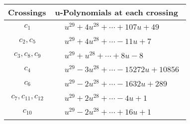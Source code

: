 \documentclass[1p]{elsarticle_modified}
\theoremstyle{definition}
\begin{document}
\begin{tabular}{m{50pt}|m{274pt}}
Crossings & \hspace{64pt}u-Polynomials at each crossing \\
\hline $$\begin{aligned}c_{1}\end{aligned}$$&$\begin{aligned}
&u^{29}+4 u^{28}+\cdots+107 u+49
\end{aligned}$\\
\hline $$\begin{aligned}c_{2},c_{5}\end{aligned}$$&$\begin{aligned}
&u^{29}+4 u^{28}+\cdots-11 u+7
\end{aligned}$\\
\hline $$\begin{aligned}c_{3},c_{8},c_{9}\end{aligned}$$&$\begin{aligned}
&u^{29}+u^{28}+\cdots+8 u-8
\end{aligned}$\\
\hline $$\begin{aligned}c_{4}\end{aligned}$$&$\begin{aligned}
&u^{29}-3 u^{28}+\cdots-15272 u+10856
\end{aligned}$\\
\hline $$\begin{aligned}c_{6}\end{aligned}$$&$\begin{aligned}
&u^{29}-2 u^{28}+\cdots-1632 u+289
\end{aligned}$\\
\hline $$\begin{aligned}c_{7},c_{11},c_{12}\end{aligned}$$&$\begin{aligned}
&u^{29}+2 u^{28}+\cdots-4 u+1
\end{aligned}$\\
\hline $$\begin{aligned}c_{10}\end{aligned}$$&$\begin{aligned}
&u^{29}-2 u^{28}+\cdots+16 u+1
\end{aligned}$\\
\hline
\end{tabular}\\~\\
\newpage\renewcommand{\arraystretch}{1}
\end{document}
